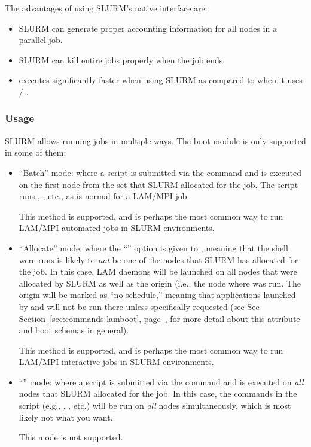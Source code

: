 The advantages of using SLURM's native interface are:

\begin{itemize}
\item SLURM can generate proper accounting information for all nodes in
  a parallel job.

\item SLURM can kill entire jobs properly when the job ends.  
  
\item {} executes significantly faster when using SLURM as
  compared to when it uses  / .
\end{itemize}


\subsubsection{Usage}

SLURM allows running jobs in multiple ways.  The  boot
module is only supported in some of them:

\begin{itemize}
\item ``Batch'' mode: where a script is submitted via the 
  command and is executed on the first node from the set that SLURM
  allocated for the job.  The script runs ,
  , etc., as is normal for a LAM/MPI job.
  
  This method is supported, and is perhaps the most common way to run
  LAM/MPI automated jobs in SLURM environments.
  
\item ``Allocate'' mode: where the ``'' option is given to
  , meaning that the shell were  runs is
  likely to {\em not} be one of the nodes that SLURM has allocated for
  the job.  In this case, LAM daemons will be launched on all nodes
  that were allocated by SLURM as well as the origin (i.e., the node
  where  was run.  The origin will be marked as
  ``no-schedule,'' meaning that applications launched by 
  and  will not be run there unless specifically
  requested (see See Section~\ref{sec:commands-lamboot},
  page~\pageref{sec:commands-lamboot}, for more detail about this
  attribute and boot schemas in general).

  This method is supported, and is perhaps the most common way to run
  LAM/MPI interactive jobs in SLURM environments.
  
\item ``'' mode: where a script is submitted via the
   command and is executed on {\em all} nodes that SLURM
  allocated for the job.  In this case, the commands in the script
  (e.g., , , etc.) will be run on {\em all}
  nodes simultaneously, which is most likely not what you want.

  This mode is not supported.
\end{itemize}

